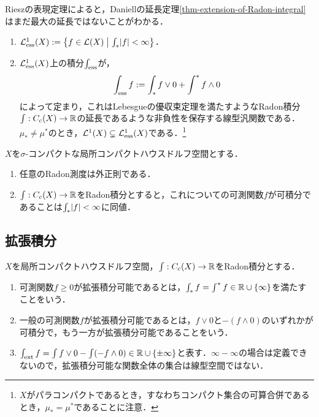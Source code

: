 \documentclass[uplatex,dvipdfmx]{jsreport}
\begin{document}
\begin{remark}
    Rieszの表現定理によると，Daniellの延長定理\ref{thm-extension-of-Radon-integral}はまだ最大の延長ではないことがわかる．
\end{remark}

\begin{definition}\mbox{}
    \begin{enumerate}
        \item $\mathcal{L}^1_{\mathrm{ess}}(X):=\left\{f\in\mathcal{L}(X)\;\middle|\;\int_*\lvert f\rvert<\infty\right\}$．
        \item $\mathcal{L}^1_{\mathrm{ess}}(X)$上の積分$\int_{\mathrm{ess}}$が，
        \[\int_{\mathrm{ess}} f:=\int_*f\lor 0+\int^*f\land 0\]
        によって定まり，これはLebesgueの優収束定理を満たすようなRadon積分$\int:C_c(X)\to\mathbb{R}$の延長であるような非負性を保存する線型汎関数である．
        $\mu_*\ne\mu^*$のとき，$\mathcal{L}^1(X)\subsetneq\mathcal{L}^1_{\mathrm{ess}}(X)$である．\footnote{$X$がパラコンパクトであるとき，すなわちコンパクト集合の可算合併であるとき，$\mu_*=\mu^*$であることに注意．}
    \end{enumerate}
\end{definition}

\begin{proposition}\label{prop-Radon-integral-on-paracompact-spaces}
    $X$を$\sigma$-コンパクトな局所コンパクトハウスドルフ空間とする．
    \begin{enumerate}
        \item 任意のRadon測度は外正則である．
        \item $\int:C_c(X)\to\mathbb{R}$をRadon積分とすると，これについての可測関数$f$が可積分であることは$\int_*\lvert f\rvert<\infty$に同値．
    \end{enumerate}
\end{proposition}

\subsection{拡張積分}

\begin{definition}
    $X$を局所コンパクトハウスドルフ空間，$\int:C_c(X)\to\mathbb{R}$をRadon積分とする．
    \begin{enumerate}
        \item 可測関数$f\ge0$が拡張積分可能であるとは，$\int_*f=\int^*f\in\mathbb{R}\cup\{\infty\}$を満たすことをいう．
        \item 一般の可測関数$f$が拡張積分可能であるとは，$f\lor0$と$-(f\land0)$のいずれかが可積分で，もう一方が拡張積分可能であることをいう．
        \item $\int_{\mathrm{ext}} f=\int f\lor0-\int(-f\land 0)\in\mathbb{R}\cup\{\pm\infty\}$と表す．$\infty-\infty$の場合は定義できないので，拡張積分可能な関数全体の集合は線型空間ではない．
    \end{enumerate}
\end{definition}
\end{document}
